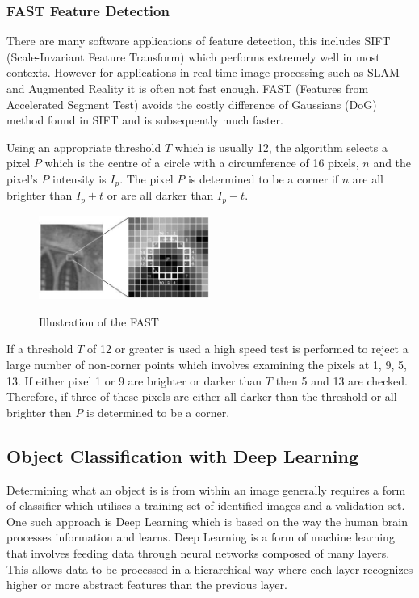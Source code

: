 \documentclass{mproj}
\begin{document}
\subsubsection{FAST Feature Detection}

There are many software applications of feature detection, this includes SIFT (Scale-Invariant Feature Transform) which performs extremely well in most contexts\cite{Mikolajczyk}. However for applications in real-time image processing such as SLAM and Augmented Reality it is often not fast enough. FAST (Features from Accelerated Segment Test) \cite{rosten_2006_machine}\cite{rosten_2005_annotations} avoids the costly difference of Gaussians (DoG) method found in SIFT and is subsequently much faster.

Using an appropriate threshold $T$ which is usually 12, the algorithm selects a pixel $P$ which is the centre of a circle with a circumference of 16 pixels, $n$ and the pixel's $P$ intensity is $I_{p}$. The pixel $P$ is determined to be a corner if $n$ are all brighter than $I_{p} + t$ or are all darker than $I_{p} - t$. 

\begin{figure}[h]
  \caption{Illustration of the FAST}
  \centering
  \includegraphics[width=0.5\textwidth]{images/fast_speedtest.jpg}
  \label{fig:FAST diagram}
\end{figure}

If a threshold $T$ of 12 or greater is used a high speed test is performed to reject a large number of non-corner points which involves examining the pixels at 1, 9, 5, 13. If either pixel 1 or 9 are brighter or darker than $T$ then 5 and 13 are checked. Therefore, if three of these pixels are either all darker than the threshold or all brighter then $P$ is determined to be a corner. 

\subsection{Object Classification with Deep Learning}

Determining what an object is is from within an image generally requires a form of  classifier which utilises a training set of identified images and a validation set. One such approach is Deep Learning which is based on the way the human brain processes information and learns. Deep Learning is a form of machine learning that involves feeding data through neural networks composed of many layers. This allows data to be processed in a hierarchical way where each layer recognizes higher or more abstract features than the previous layer.
\end{document}
